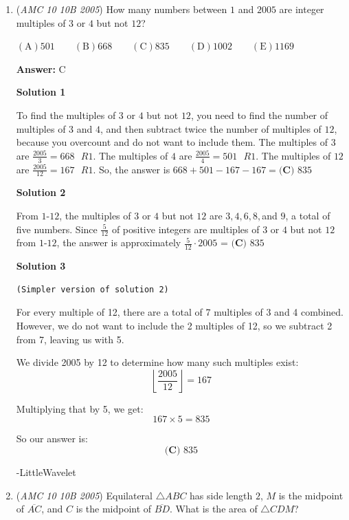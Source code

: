 \begin{enumerate}
	\item (\textit{AMC 10 10B 2005}) How many numbers between $1$ and $2005$ are integer multiples of $3$ or $4$ but not $12$?


 $\mathrm{(A)} 501 \qquad \mathrm{(B)} 668 \qquad \mathrm{(C)} 835 \qquad \mathrm{(D)} 1002 \qquad \mathrm{(E)} 1169$

 \textbf{Answer: }C



\textbf{Solution 1}

To find the multiples of $3$ or $4$ but not $12$, you need to find the number of multiples of $3$ and $4$, and then subtract twice the number of multiples of $12$, because you overcount and do not want to include them. The multiples of $3$ are $\frac{2005}{3} = 668\text{ }R1.$ The multiples of $4$ are $\frac{2005}{4} = 501 \text{ }R1$. The multiples of $12$ are $\frac{2005}{12} = 167\text{ }R1.$ So, the answer is $668+501-167-167 = \boxed{\textbf{(C) } 835}$




\textbf{Solution 2}

From $1$-$12$, the multiples of $3$ or $4$ but not $12$ are $3, 4, 6, 8,$and $9$, a total of five numbers. Since $\frac{5}{12}$ of positive integers are multiples of $3$ or $4$ but not $12$ from $1$-$12$, the answer is approximately $\frac{5}{12} \cdot 2005$ = $\boxed{\textbf{(C) }835}$




\textbf{Solution 3}

\begin{verbatim}
(Simpler version of solution 2)
\end{verbatim}

For every multiple of 12, there are a total of 7 multiples of 3 and 4 combined. However, we do not want to include the 2 multiples of 12, so we subtract 2 from 7, leaving us with 5.

 We divide 2005 by 12 to determine how many such multiples exist:
 \[\left\lfloor \frac{2005}{12} \right\rfloor = 167\]

 Multiplying that by 5, we get:
 \[167 \times 5 = 835\]

 So our answer is:
 \[\boxed{\textbf{(C) } 835}\]

 -LittleWavelet

 


	\item (\textit{AMC 10 10B 2005}) Equilateral $\triangle ABC$ has side length $2$, $M$ is the midpoint of $\overline{AC}$, and $C$ is the midpoint of $\overline{BD}$. What is the area of $\triangle CDM$?


\end{enumerate}
